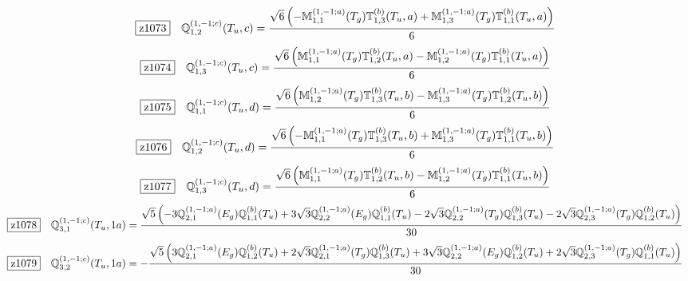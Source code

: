 \documentclass[fleqn,10pt,landscape]{jsarticle}
\begin{document}
\begin{dmath*}
\hspace*{3mm}\fbox{z1073}\quad \mathbb{Q}_{1,2}^{(1,-1;c)}(T_{u},c)=\frac{\sqrt{6} \left(- \mathbb{M}_{1,1}^{(1,-1;a)}(T_{g}) \mathbb{T}_{1,3}^{(b)}(T_{u},a) + \mathbb{M}_{1,3}^{(1,-1;a)}(T_{g}) \mathbb{T}_{1,1}^{(b)}(T_{u},a)\right)}{6}
\end{dmath*}
\begin{dmath*}
\hspace*{3mm}\fbox{z1074}\quad \mathbb{Q}_{1,3}^{(1,-1;c)}(T_{u},c)=\frac{\sqrt{6} \left(\mathbb{M}_{1,1}^{(1,-1;a)}(T_{g}) \mathbb{T}_{1,2}^{(b)}(T_{u},a) - \mathbb{M}_{1,2}^{(1,-1;a)}(T_{g}) \mathbb{T}_{1,1}^{(b)}(T_{u},a)\right)}{6}
\end{dmath*}
\begin{dmath*}
\hspace*{3mm}\fbox{z1075}\quad \mathbb{Q}_{1,1}^{(1,-1;c)}(T_{u},d)=\frac{\sqrt{6} \left(\mathbb{M}_{1,2}^{(1,-1;a)}(T_{g}) \mathbb{T}_{1,3}^{(b)}(T_{u},b) - \mathbb{M}_{1,3}^{(1,-1;a)}(T_{g}) \mathbb{T}_{1,2}^{(b)}(T_{u},b)\right)}{6}
\end{dmath*}
\begin{dmath*}
\hspace*{3mm}\fbox{z1076}\quad \mathbb{Q}_{1,2}^{(1,-1;c)}(T_{u},d)=\frac{\sqrt{6} \left(- \mathbb{M}_{1,1}^{(1,-1;a)}(T_{g}) \mathbb{T}_{1,3}^{(b)}(T_{u},b) + \mathbb{M}_{1,3}^{(1,-1;a)}(T_{g}) \mathbb{T}_{1,1}^{(b)}(T_{u},b)\right)}{6}
\end{dmath*}
\begin{dmath*}
\hspace*{3mm}\fbox{z1077}\quad \mathbb{Q}_{1,3}^{(1,-1;c)}(T_{u},d)=\frac{\sqrt{6} \left(\mathbb{M}_{1,1}^{(1,-1;a)}(T_{g}) \mathbb{T}_{1,2}^{(b)}(T_{u},b) - \mathbb{M}_{1,2}^{(1,-1;a)}(T_{g}) \mathbb{T}_{1,1}^{(b)}(T_{u},b)\right)}{6}
\end{dmath*}
\begin{dmath*}
\hspace*{3mm}\fbox{z1078}\quad \mathbb{Q}_{3,1}^{(1,-1;c)}(T_{u},1a)=\frac{\sqrt{5} \left(- 3 \mathbb{Q}_{2,1}^{(1,-1;a)}(E_{g}) \mathbb{Q}_{1,1}^{(b)}(T_{u}) + 3 \sqrt{3} \mathbb{Q}_{2,2}^{(1,-1;a)}(E_{g}) \mathbb{Q}_{1,1}^{(b)}(T_{u}) - 2 \sqrt{3} \mathbb{Q}_{2,2}^{(1,-1;a)}(T_{g}) \mathbb{Q}_{1,3}^{(b)}(T_{u}) - 2 \sqrt{3} \mathbb{Q}_{2,3}^{(1,-1;a)}(T_{g}) \mathbb{Q}_{1,2}^{(b)}(T_{u})\right)}{30}
\end{dmath*}
\begin{dmath*}
\hspace*{3mm}\fbox{z1079}\quad \mathbb{Q}_{3,2}^{(1,-1;c)}(T_{u},1a)=- \frac{\sqrt{5} \left(3 \mathbb{Q}_{2,1}^{(1,-1;a)}(E_{g}) \mathbb{Q}_{1,2}^{(b)}(T_{u}) + 2 \sqrt{3} \mathbb{Q}_{2,1}^{(1,-1;a)}(T_{g}) \mathbb{Q}_{1,3}^{(b)}(T_{u}) + 3 \sqrt{3} \mathbb{Q}_{2,2}^{(1,-1;a)}(E_{g}) \mathbb{Q}_{1,2}^{(b)}(T_{u}) + 2 \sqrt{3} \mathbb{Q}_{2,3}^{(1,-1;a)}(T_{g}) \mathbb{Q}_{1,1}^{(b)}(T_{u})\right)}{30}
\end{dmath*}
\end{document}
